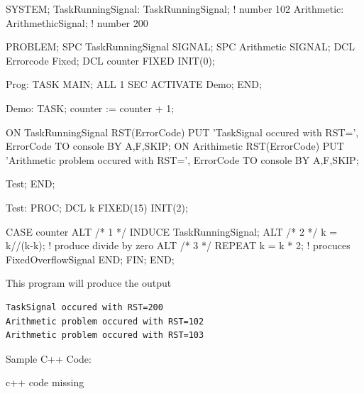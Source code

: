 \begin{PEARLCode}
SYSTEM;
   TaskRunningSignal: TaskRunningSignal; ! number 102
   Arithmetic: ArithmethicSignal;        ! number 200

PROBLEM;
   SPC TaskRunningSignal SIGNAL;
   SPC Arithmetic SIGNAL;
   DCL Errorcode Fixed;
   DCL counter FIXED INIT(0);

Prog: TASK MAIN;
    ALL 1 SEC ACTIVATE Demo;
END;

Demo: TASK; 
   counter := counter + 1;

   ON TaskRunningSignal RST(ErrorCode)
	PUT 'TaskSignal occured with RST=', ErrorCode TO console BY A,F,SKIP;
   ON Arithimetic RST(ErrorCode)
	PUT 'Arithmetic problem occured with RST=', ErrorCode TO console BY A,F,SKIP;

   Test;
END;

Test: PROC;
   DCL k FIXED(15) INIT(2);

   CASE counter
   ALT /* 1 */ INDUCE TaskRunningSignal;
   ALT /* 2 */ k = k//(k-k);   ! produce divide by zero
   ALT /* 3 */ REPEAT  
	  	k = k * 2;  ! procuces FixedOverflowSignal
	       END;
   FIN;
END;
\end{PEARLCode}

This program will produce the output
\begin{verbatim}
TaskSignal occured with RST=200
Arithmetic problem occured with RST=102
Arithmetic problem occured with RST=103
\end{verbatim}

Sample C++ Code:
\begin{CppCode}
c++ code missing
\end{CppCode}
